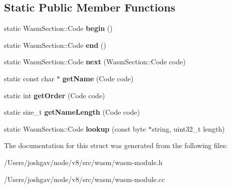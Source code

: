 \subsection*{Static Public Member Functions}
\begin{DoxyCompactItemize}
\item 
static Wasm\+Section\+::\+Code {\bfseries begin} ()\hypertarget{structv8_1_1internal_1_1wasm_1_1_wasm_section_ae179830e0286f7529df61065d6d9b9e9}{}\label{structv8_1_1internal_1_1wasm_1_1_wasm_section_ae179830e0286f7529df61065d6d9b9e9}

\item 
static Wasm\+Section\+::\+Code {\bfseries end} ()\hypertarget{structv8_1_1internal_1_1wasm_1_1_wasm_section_a829a4ef2c4dcf5d3935ed598cfd921fe}{}\label{structv8_1_1internal_1_1wasm_1_1_wasm_section_a829a4ef2c4dcf5d3935ed598cfd921fe}

\item 
static Wasm\+Section\+::\+Code {\bfseries next} (Wasm\+Section\+::\+Code code)\hypertarget{structv8_1_1internal_1_1wasm_1_1_wasm_section_a00c67c2e58d77fe74f5a4010cc6fc20d}{}\label{structv8_1_1internal_1_1wasm_1_1_wasm_section_a00c67c2e58d77fe74f5a4010cc6fc20d}

\item 
static const char $\ast$ {\bfseries get\+Name} (Code code)\hypertarget{structv8_1_1internal_1_1wasm_1_1_wasm_section_a19f0486d1502ef0b0cfdcbfaeca2ff88}{}\label{structv8_1_1internal_1_1wasm_1_1_wasm_section_a19f0486d1502ef0b0cfdcbfaeca2ff88}

\item 
static int {\bfseries get\+Order} (Code code)\hypertarget{structv8_1_1internal_1_1wasm_1_1_wasm_section_a910656735b4eae739c70e379f0a99a00}{}\label{structv8_1_1internal_1_1wasm_1_1_wasm_section_a910656735b4eae739c70e379f0a99a00}

\item 
static size\+\_\+t {\bfseries get\+Name\+Length} (Code code)\hypertarget{structv8_1_1internal_1_1wasm_1_1_wasm_section_a891b6cd2b3f44465dd6b0d2812dc895d}{}\label{structv8_1_1internal_1_1wasm_1_1_wasm_section_a891b6cd2b3f44465dd6b0d2812dc895d}

\item 
static Wasm\+Section\+::\+Code {\bfseries lookup} (const byte $\ast$string, uint32\+\_\+t length)\hypertarget{structv8_1_1internal_1_1wasm_1_1_wasm_section_a1ae45b060069cdf1c99abebc3ada569f}{}\label{structv8_1_1internal_1_1wasm_1_1_wasm_section_a1ae45b060069cdf1c99abebc3ada569f}

\end{DoxyCompactItemize}


The documentation for this struct was generated from the following files\+:\begin{DoxyCompactItemize}
\item 
/\+Users/joshgav/node/v8/src/wasm/wasm-\/module.\+h\item 
/\+Users/joshgav/node/v8/src/wasm/wasm-\/module.\+cc\end{DoxyCompactItemize}

